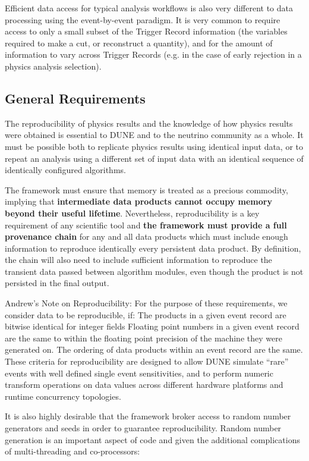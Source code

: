 \documentclass[../main-v1.tex]{subfiles}
\begin{document}
Efficient data access for typical analysis workflows is also very different to data processing using the event-by-event paradigm. It is very common to require access to only a small subset of the Trigger Record information (the variables required to make a cut, or reconstruct a quantity), and for the amount of information to vary across Trigger Records (e.g. in the case of early rejection in a physics analysis selection).






\subsection{General Requirements} %

The reproducibility of physics results and the knowledge of how physics results were obtained is essential to DUNE and to the neutrino community as a whole.  It must be possible both to replicate physics results using identical input data, or to repeat an analysis using a different set of input data with an identical sequence of identically configured algorithms. 

The framework must ensure that memory is treated as a precious commodity, implying that {\bf intermediate data products cannot occupy memory beyond their useful lifetime}.  Nevertheless, reproducibility is a key requirement of any scientific tool and {\bf the framework must provide a full provenance chain} for any and all data products which must include enough information to reproduce identically every persistent data product. By definition, the chain will also need to include sufficient information to reproduce the transient data passed between algorithm modules, even though the product is not persisted in the final output.

Andrew's Note on Reproducibility: For the purpose of these requirements, we consider data to be reproducible, if:
The products in a given event record are bitwise identical for integer fields
Floating point numbers in a given event record are the same to within the floating point precision of the machine they were generated on.
The ordering of data products within an event record are the same.
These criteria for reproducibility are designed to allow DUNE simulate “rare” events with well defined single event sensitivities, and to perform numeric transform operations on data values across different hardware platforms and runtime concurrency topologies.

It is also highly desirable that the framework broker access to random number generators and seeds in order to guarantee reproducibility.  Random number generation is an important aspect of code and given the additional complications of multi-threading and co-processors:
\end{document}
